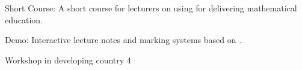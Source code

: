 \begin{workpackage}
\begin{wpdelivs}
 \begin{wpdeliv}[due=18,id=short-course,dissem=PU,nature=DEC,lead=USH]{Short Course: A short course for lecturers on using \TheProject for delivering mathematical education.}\end{wpdeliv}
 \begin{wpdeliv}[due=36,id=lecture-notes,dissem=PU,nature=DEM]{Demo: Interactive lecture notes and marking systems based on \TheProject.}\end{wpdeliv}
 \begin{wpdeliv}[due=48,id=developing-countries4,dissem=PU,nature=DEM,lead=UB]{Workshop in developing country 4} \end{wpdeliv}


\end{wpdelivs}


\end{workpackage}


